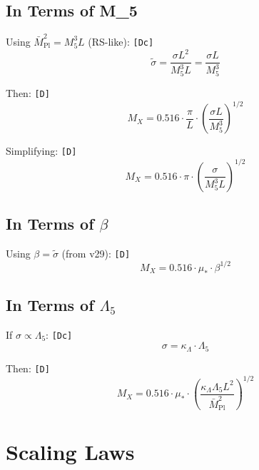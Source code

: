 \documentclass[11pt,a4paper]{article}
\newcommand{\tagD}{\textcolor{green!50!black}{\texttt{[D]}}}
\newcommand{\tagDc}{\textcolor{blue!70!black}{\texttt{[Dc]}}}
\theoremstyle{definition}
\begin{document}
\subsection{In Terms of M\_5}
\label{app:m5-param}

Using $\bar{M}_{\text{Pl}}^2 = M_5^3 L$ (RS-like): \tagDc{}
\begin{equation}
\label{eq:sigma-m5-form}
\tilde{\sigma} = \frac{\sigma L^2}{M_5^3 L} = \frac{\sigma L}{M_5^3}
\end{equation}

Then: \tagD{}
\begin{equation}
\label{eq:mx-m5-form}
M_X = 0.516 \cdot \frac{\pi}{L} \cdot \left(\frac{\sigma L}{M_5^3}\right)^{1/2}
\end{equation}

Simplifying: \tagD{}
\begin{equation}
\label{eq:mx-m5-simplified}
M_X = 0.516 \cdot \pi \cdot \left(\frac{\sigma}{M_5^3 L}\right)^{1/2}
\end{equation}

\subsection{In Terms of $\beta$}
\label{app:beta-param}

Using $\beta = \tilde{\sigma}$ (from v29): \tagD{}
\begin{equation}
\label{eq:mx-beta-form}
M_X = 0.516 \cdot \mu_* \cdot \beta^{1/2}
\end{equation}

\subsection{In Terms of $\Lambda_5$}
\label{app:lambda5-param}

If $\sigma \propto \Lambda_5$: \tagDc{}
\begin{equation}
\label{eq:sigma-lambda5}
\sigma = \kappa_\Lambda \cdot \Lambda_5
\end{equation}

Then: \tagD{}
\begin{equation}
\label{eq:mx-lambda5-form}
M_X = 0.516 \cdot \mu_* \cdot \left(\frac{\kappa_\Lambda \Lambda_5 L^2}{\bar{M}_{\text{Pl}}^2}\right)^{1/2}
\end{equation}

\section{Scaling Laws}
\label{app:scaling}
\end{document}
